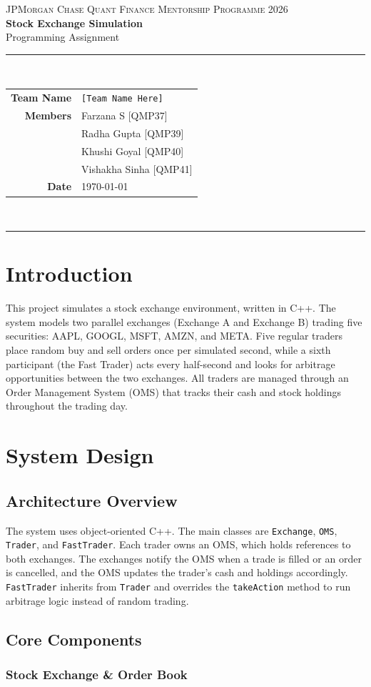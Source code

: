 \documentclass[11pt, a4paper]{article}
\renewcommand{\maketitle}{%
  \begin{center}
    {\footnotesize\scshape\color{gray} JPMorgan Chase Quant Finance Mentorship Programme 2026}\\[0.5em]
    {\LARGE\bfseries\color{jpblue} Stock Exchange Simulation}\\[0.3em]
    {\large Programming Assignment}\\[1.2em]
    \textcolor{rulecolor}{\rule{0.55\linewidth}{0.6pt}}\\[1.2em]
    \begin{tabular}{rl}
      \textbf{Team Name} & \texttt{[Team Name Here]} \\[0.4em]
      \textbf{Members}   & Farzana S [QMP37] \\
                         & Radha Gupta [QMP39] \\
                         & Khushi Goyal [QMP40] \\
                         & Vishakha Sinha [QMP41] \\
      \textbf{Date}      & \today \\
    \end{tabular}\\[1.4em]
    \textcolor{rulecolor}{\rule{0.55\linewidth}{0.6pt}}
  \end{center}
  \vspace{1.5em}
}
\begin{document}
\maketitle
\thispagestyle{empty}

\section{Introduction}

This project simulates a stock exchange environment, written in C++. The system models two parallel exchanges (Exchange A and Exchange B) trading five securities: AAPL, GOOGL, MSFT, AMZN, and META. Five regular traders place random buy and sell orders once per simulated second, while a sixth participant  (the Fast Trader) acts every half-second and looks for arbitrage opportunities between the two exchanges. All traders are managed through an Order Management System (OMS) that tracks their cash and stock holdings throughout the trading day.

\section{System Design}

\subsection{Architecture Overview}

The system uses object-oriented C++. The main classes are \texttt{Exchange}, \texttt{OMS}, \texttt{Trader}, and \texttt{FastTrader}. Each trader owns an OMS, which holds references to both exchanges. The exchanges notify the OMS when a trade is filled or an order is cancelled, and the OMS updates the trader's cash and holdings accordingly. \texttt{FastTrader} inherits from \texttt{Trader} and overrides the \texttt{takeAction} method to run arbitrage logic instead of random trading.

\subsection{Core Components}

\subsubsection{Stock Exchange \& Order Book}
\end{document}
